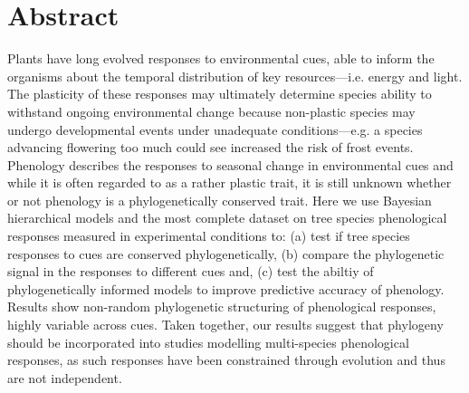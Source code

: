 \documentclass{article}\usepackage[]{graphicx}\usepackage[]{color}
\begin{document}
\section*{Abstract}
\begin{enumerate}

Plants have long evolved responses to environmental cues, able to inform the organisms about the temporal distribution of key resources---i.e. energy and light. The plasticity of these responses may ultimately determine species ability to withstand ongoing environmental change because non-plastic species may undergo developmental events under unadequate conditions---e.g. a species advancing flowering too much could see increased the risk of frost events. Phenology describes the responses to seasonal change in environmental cues and while it is often regarded to as a rather plastic trait, it is still unknown whether or not phenology is a phylogenetically conserved trait. Here we use Bayesian hierarchical models and the most complete dataset on tree species phenological responses measured in experimental conditions to: (a) test if tree species responses to cues are conserved phylogenetically, (b) compare the phylogenetic signal in the responses to different cues and, (c) test the abiltiy of phylogenetically informed models to improve predictive accuracy of phenology. Results show non-random phylogenetic structuring of phenological responses, highly variable across cues.  
Taken together, our results suggest that phylogeny should be incorporated into studies modelling multi-species phenological responses, as such responses have been constrained through evolution and thus are not independent.  


\end{enumerate}
\end{document}
